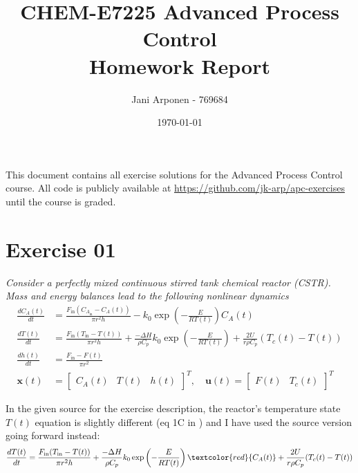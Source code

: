 \documentclass[letterpaper,12pt]{article}
\begin{document}
\title{CHEM-E7225 Advanced Process Control \\
        Homework Report
        }

\author{Jani Arponen - 769684}
\date{\today}
\maketitle

This document contains all exercise solutions for the Advanced Process Control course. All code is publicly available at \url{https://github.com/jk-arp/apc-exercises} until the course is graded.

\section*{Exercise 01}
\textit{Consider a perfectly mixed continuous stirred tank chemical reactor (CSTR). Mass and energy balances lead to the following nonlinear dynamics}
\begin{equation} \label{eq:cstr1}
\begin{aligned}
	\frac{dC_A(t)}{dt} &= \frac{F_{\text{in}}(C_{A_{\text{in}}} - C_A(t))}{\pi r^2 h} - k_0 \exp\left(-\frac{E}{RT(t)}\right)C_A(t) \\
	\frac{dT(t)}{dt} &= \frac{F_{\text{in}}(T_{\text{in}} - T(t))}{\pi r^2 h} + \frac{-\Delta H}{\rho C_p}k_0 \exp\left(-\frac{E}{RT(t)}\right) + \frac{2U}{r\rho C_p}(T_c(t) - T(t)) \\
	\frac{dh(t)}{dt} &= \frac{F_{\text{in}} - F(t)}{\pi r^2} \\
	\mathbf{x}(t) &= \begin{bmatrix}
		C_A(t) & T(t) & h(t)
	\end{bmatrix}^T,\quad \mathbf{u}(t) = \begin{bmatrix}
		F(t) & T_c(t)
	\end{bmatrix}^T
\end{aligned}
\end{equation}

In the given source \cite{CSTR} for the exercise description, the reactor's temperature state $T(t)$ equation is slightly different (eq 1C in \cite{CSTR}) and I have used the source version going forward instead:
\begin{equation} \label{eq:cstr2}
\begin{aligned}
	\frac{dT(t)}{dt} &= \frac{F_{\text{in}}(T_{\text{in}} - T(t))}{\pi r^2 h} + \frac{-\Delta H}{\rho C_p}k_0 \exp\left(-\frac{E}{RT(t)}\right)\textcolor{red}{C_{A}(t)} + \frac{2U}{r\rho C_p}(T_c(t) - T(t)) \\
\end{aligned}
\end{equation}
\end{document}
